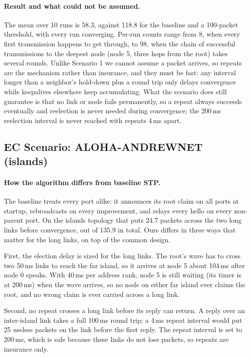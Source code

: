 \documentclass[11pt]{article}
\begin{document}
\paragraph{Result and what could not be assumed.}
The mean over 10 runs is 58.3, against 118.8 for the baseline and a 100-packet threshold, with every run converging.
Per-run counts range from 8, when every first transmission happens to get through, to 98, when the chain of successful transmissions to the deepest node (node 5, three hops from the root) takes several rounds.
Unlike Scenario 1 we cannot assume a packet arrives, so repeats are the mechanism rather than insurance, and they must be fast: any interval longer than a neighbor's hold-down plus a round trip only delays convergence while keepalives elsewhere keep accumulating.
What the scenario does still guarantee is that no link or node fails permanently, so a repeat always succeeds eventually and reelection is never needed during convergence; the 200\,ms reelection interval is never reached with repeats 4\,ms apart.

\subsection{EC Scenario: ALOHA-ANDREWNET (islands)}

\paragraph{How the algorithm differs from baseline STP.}
The baseline treats every port alike: it announces its root claim on all ports at startup, rebroadcasts on every improvement, and relays every hello on every non-parent port.
On the islands topology that puts 24.7 packets across the two long links before convergence, out of 135.9 in total.
Ours differs in three ways that matter for the long links, on top of the common design.

First, the election delay is sized for the long links.
The root's wave has to cross two 50\,ms links to reach the far island, so it arrives at node 5 about 104\,ms after node 0 speaks.
With 40\,ms per address rank, node 5 is still waiting (its timer is at 200\,ms) when the wave arrives, so no node on either far island ever claims the root, and no wrong claim is ever carried across a long link.

Second, no repeat crosses a long link before its reply can return.
A reply over an inter-island link takes a full 100\,ms round trip; a 4\,ms repeat interval would put 25 useless packets on the link before the first reply.
The repeat interval is set to 200\,ms, which is safe because these links do not lose packets, so repeats are insurance only.
\end{document}

